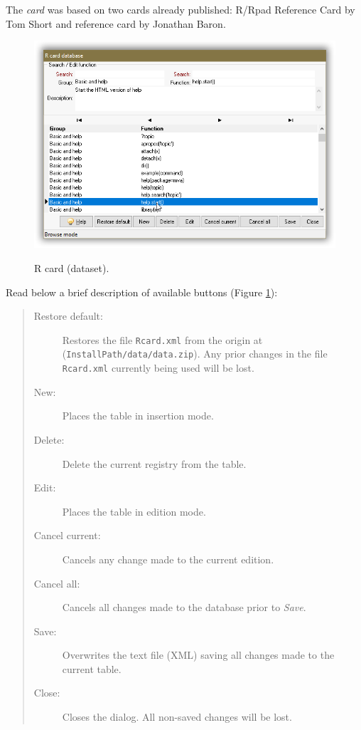 The \textit{card} was based on two \RR{} cards already published:
R/Rpad Reference Card by Tom Short and \RR{} reference card by Jonathan Baron.

\begin{figure}[H]
  \includegraphics[scale=0.35]{./res/dlg_r_card.png}\\
  \caption{R card (dataset).}
  \label{fig:dlg_r_card}
\end{figure}

Read below a brief description of available buttons (Figure \ref{fig:dlg_r_card}):

\begin{quote}
  \begin{footnotesize}
    \begin{description}
      \item[Restore default:]
        Restores the file \texttt{Rcard.xml} from the origin at
        (\texttt{InstallPath/data/data.zip}). Any prior changes in the
        file \texttt{Rcard.xml} currently being used will be lost.
      \item[New:]
        Places the table in insertion mode.
      \item[Delete:]
        Delete the current registry from the table.
      \item[Edit:]
        Places the table in edition mode.
      \item[Cancel current:]
        Cancels any change made to the current edition.
      \item[Cancel all:]
        Cancels all changes made to the database prior to \textit{Save}.
      \item[Save:]
        Overwrites the text file (XML) saving all changes made to the current table.
      \item[Close:]
        Closes the dialog. All non-saved changes will be lost.
    \end{description}
  \end{footnotesize}
\end{quote}


